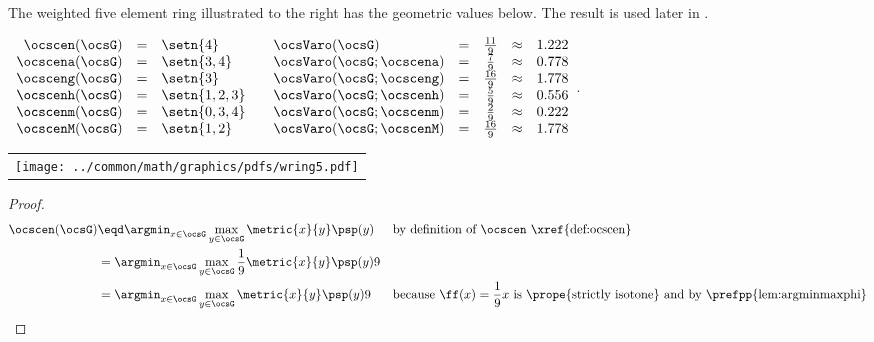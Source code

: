 \begin{tabstr}{0.75}
\begin{example}
\label{ex:wring5}
The weighted five element ring illustrated to the right has the geometric values below.
The  result is used later in .
\\\begin{minipage}{\tw-65mm}%
\indentx$\begin{array}{rcl @{\qquad} lcccl}
    \ocscen (\ocsG) &=&\setn{4}      & \ocsVaro(\ocsG)          &=& \frac{11}{9} &\approx& 1.222 \\
    \ocscena(\ocsG) &=&\setn{3,4}    & \ocsVaro(\ocsG;\ocscena) &=& \frac{ 7}{9} &\approx& 0.778\\
    \ocsceng(\ocsG) &=&\setn{3}      & \ocsVaro(\ocsG;\ocsceng) &=& \frac{16}{9} &\approx& 1.778\\
    \ocscenh(\ocsG) &=&\setn{1,2,3}  & \ocsVaro(\ocsG;\ocscenh) &=& \frac{5}{9}  &\approx& 0.556\\
    \ocscenm(\ocsG) &=&\setn{0,3,4}  & \ocsVaro(\ocsG;\ocscenm) &=& \frac{2}{9}  &\approx& 0.222\\
    \ocscenM(\ocsG) &=&\setn{1,2}    & \ocsVaro(\ocsG;\ocscenM) &=& \frac{16}{9} &\approx& 1.778
  \end{array}$.
\end{minipage}\hfill%
\begin{tabular}{c}
  \gsize%
  {\texttt{[image: ../common/math/graphics/pdfs/wring5.pdf]}}%
\end{tabular}
\end{example}
\begin{proof}
    \begin{align*}
      \ocscen(\ocsG)
        &\eqd \argmin_{x\in\ocsG}\max_{y\in\ocsG}\metric{x}{y}\psp(y)
        &&\text{by definition of $\ocscen$ \xref{def:ocscen}}
      \\&= \argmin_{x\in\ocsG}\max_{y\in\ocsG}\frac{1}{9}\metric{x}{y}\psp(y)9
      \\&= \argmin_{x\in\ocsG}\max_{y\in\ocsG}\metric{x}{y}\psp(y)9
        &&\text{because $\ff(x)=\frac{1}{9}x$ is \prope{strictly isotone} and by \prefpp{lem:argminmaxphi}}

\end{align*}
\end{proof}
\end{tabstr}
